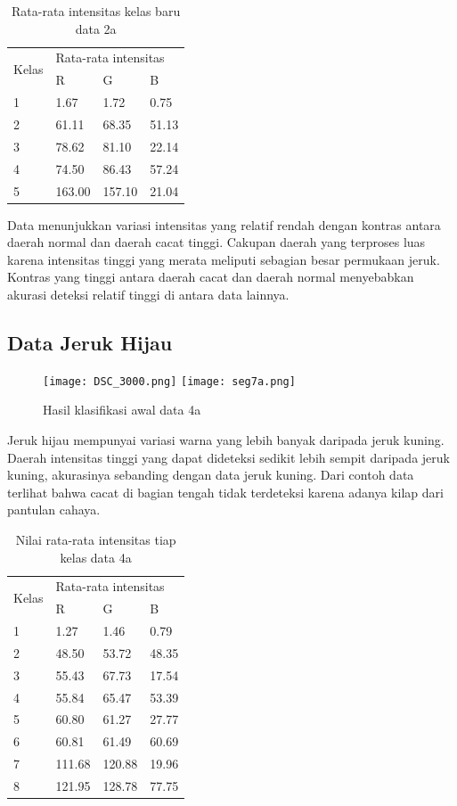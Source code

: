 \documentclass[laporan.tex]{subfiles}
\begin{document}
\begin{table}[h!]
\centering
\begin{tabular}{|l|l|l|l|}
\cline{1-4}
\multirow{2}{*}{Kelas} & \multicolumn{3}{l|}{Rata-rata intensitas} \\
\cline{2-4}
 & R & G & B \\
\cline{1-4}
1 & 1.67 & 1.72 & 0.75 \\
2 & 61.11 & 68.35 & 51.13 \\
3 & 78.62 & 81.10 & 22.14 \\
4 & 74.50 & 86.43 & 57.24 \\
5 & 163.00 & 157.10 & 21.04 \\
\cline{1-4}
\end{tabular}
\caption[]{Rata-rata intensitas kelas baru data 2a}
\label{table:avgyellow2}
\end{table}

Data menunjukkan variasi intensitas yang relatif rendah dengan kontras antara daerah normal dan daerah cacat tinggi. Cakupan daerah yang terproses luas karena intensitas tinggi yang merata meliputi sebagian besar permukaan jeruk. Kontras yang tinggi antara daerah cacat dan daerah normal menyebabkan akurasi deteksi relatif tinggi di antara data lainnya.

\FloatBarrier
\subsection{Data Jeruk Hijau}

\begin{figure}[h!]
\centering
\texttt{[image: DSC\_3000.png]}
\texttt{[image: seg7a.png]}
\caption[]{Hasil klasifikasi awal data 4a}
\end{figure}

Jeruk hijau mempunyai variasi warna yang lebih banyak daripada jeruk kuning. Daerah intensitas tinggi yang dapat dideteksi sedikit lebih sempit daripada jeruk kuning, akurasinya sebanding dengan data jeruk kuning. Dari contoh data terlihat bahwa cacat di bagian tengah tidak terdeteksi karena adanya kilap dari pantulan cahaya.

\begin{table}[h]
\centering
\begin{tabular}{|l|l|l|l|}
\cline{1-4}
\multirow{2}{*}{Kelas} & \multicolumn{3}{l|}{Rata-rata intensitas} \\
\cline{2-4}
 & R & G & B \\
\cline{1-4}
1 & 1.27 & 1.46 & 0.79 \\
2 & 48.50 & 53.72 & 48.35 \\
3 & 55.43 & 67.73 & 17.54 \\
4 & 55.84 & 65.47 & 53.39 \\
5 & 60.80 & 61.27 & 27.77 \\
6 & 60.81 & 61.49 & 60.69 \\
7 & 111.68 & 120.88 & 19.96 \\
8 & 121.95 & 128.78 & 77.75 \\
\cline{1-4}
\end{tabular}
\caption[]{Nilai rata-rata intensitas tiap kelas data 4a}
\label{table:avggreen1}
\end{table}
\end{document}
